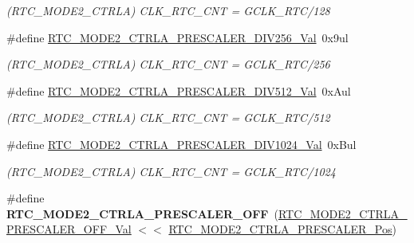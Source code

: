 \begin{DoxyCompactItemize}
\begin{DoxyCompactList}\small\item\em (R\+T\+C\+\_\+\+M\+O\+D\+E2\+\_\+\+C\+T\+R\+L\+A) C\+L\+K\+\_\+\+R\+T\+C\+\_\+\+C\+N\+T = G\+C\+L\+K\+\_\+\+R\+T\+C/128 \end{DoxyCompactList}\item 
\hypertarget{group___s_a_m_l21___r_t_c_gadbb925a049a91ee8fdf22219a212a159}{}\#define \hyperlink{group___s_a_m_l21___r_t_c_gadbb925a049a91ee8fdf22219a212a159}{R\+T\+C\+\_\+\+M\+O\+D\+E2\+\_\+\+C\+T\+R\+L\+A\+\_\+\+P\+R\+E\+S\+C\+A\+L\+E\+R\+\_\+\+D\+I\+V256\+\_\+\+Val}~0x9ul\label{group___s_a_m_l21___r_t_c_gadbb925a049a91ee8fdf22219a212a159}

\begin{DoxyCompactList}\small\item\em (R\+T\+C\+\_\+\+M\+O\+D\+E2\+\_\+\+C\+T\+R\+L\+A) C\+L\+K\+\_\+\+R\+T\+C\+\_\+\+C\+N\+T = G\+C\+L\+K\+\_\+\+R\+T\+C/256 \end{DoxyCompactList}\item 
\hypertarget{group___s_a_m_l21___r_t_c_gabf337845971381f76b43e11bd52f326b}{}\#define \hyperlink{group___s_a_m_l21___r_t_c_gabf337845971381f76b43e11bd52f326b}{R\+T\+C\+\_\+\+M\+O\+D\+E2\+\_\+\+C\+T\+R\+L\+A\+\_\+\+P\+R\+E\+S\+C\+A\+L\+E\+R\+\_\+\+D\+I\+V512\+\_\+\+Val}~0x\+Aul\label{group___s_a_m_l21___r_t_c_gabf337845971381f76b43e11bd52f326b}

\begin{DoxyCompactList}\small\item\em (R\+T\+C\+\_\+\+M\+O\+D\+E2\+\_\+\+C\+T\+R\+L\+A) C\+L\+K\+\_\+\+R\+T\+C\+\_\+\+C\+N\+T = G\+C\+L\+K\+\_\+\+R\+T\+C/512 \end{DoxyCompactList}\item 
\hypertarget{group___s_a_m_l21___r_t_c_gac684af53e262ac2783c710bb59c0c008}{}\#define \hyperlink{group___s_a_m_l21___r_t_c_gac684af53e262ac2783c710bb59c0c008}{R\+T\+C\+\_\+\+M\+O\+D\+E2\+\_\+\+C\+T\+R\+L\+A\+\_\+\+P\+R\+E\+S\+C\+A\+L\+E\+R\+\_\+\+D\+I\+V1024\+\_\+\+Val}~0x\+Bul\label{group___s_a_m_l21___r_t_c_gac684af53e262ac2783c710bb59c0c008}

\begin{DoxyCompactList}\small\item\em (R\+T\+C\+\_\+\+M\+O\+D\+E2\+\_\+\+C\+T\+R\+L\+A) C\+L\+K\+\_\+\+R\+T\+C\+\_\+\+C\+N\+T = G\+C\+L\+K\+\_\+\+R\+T\+C/1024 \end{DoxyCompactList}\item 
\hypertarget{group___s_a_m_l21___r_t_c_gad4a3bed64abe6f63aaf641ff205420d2}{}\#define {\bfseries R\+T\+C\+\_\+\+M\+O\+D\+E2\+\_\+\+C\+T\+R\+L\+A\+\_\+\+P\+R\+E\+S\+C\+A\+L\+E\+R\+\_\+\+O\+F\+F}~(\hyperlink{group___s_a_m_l21___r_t_c_gaf4d699218ec1c0cc55b9f43f64344ab7}{R\+T\+C\+\_\+\+M\+O\+D\+E2\+\_\+\+C\+T\+R\+L\+A\+\_\+\+P\+R\+E\+S\+C\+A\+L\+E\+R\+\_\+\+O\+F\+F\+\_\+\+Val} $<$$<$ \hyperlink{group___s_a_m_l21___r_t_c_ga8ceb43a4478f656d6288fabd99a094fb}{R\+T\+C\+\_\+\+M\+O\+D\+E2\+\_\+\+C\+T\+R\+L\+A\+\_\+\+P\+R\+E\+S\+C\+A\+L\+E\+R\+\_\+\+Pos})\label{group___s_a_m_l21___r_t_c_gad4a3bed64abe6f63aaf641ff205420d2}


\end{DoxyCompactItemize}
